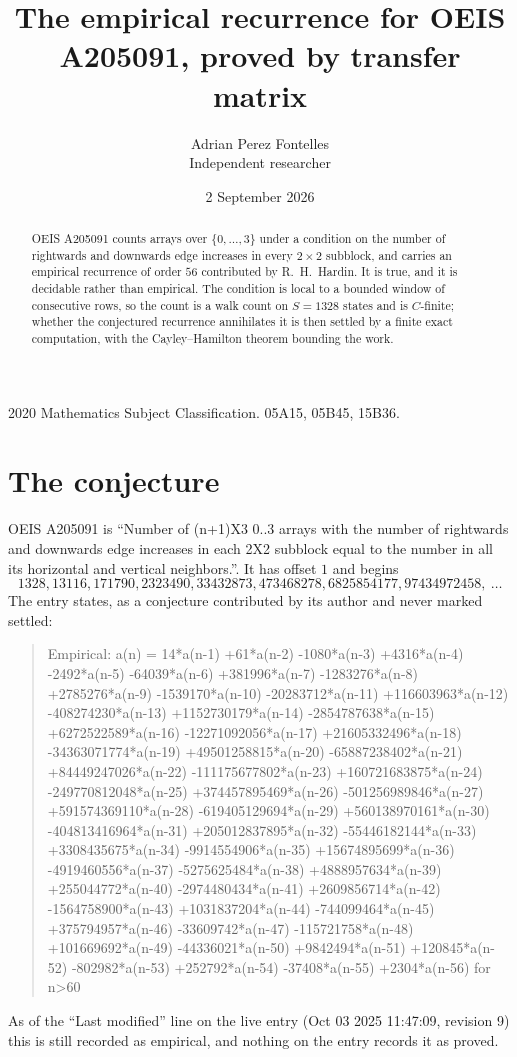 \documentclass[11pt,a4paper]{article}
\title{The empirical recurrence for OEIS A205091, proved by transfer matrix}
\author{Adrian Perez Fontelles\\ \small Independent researcher}
\date{2 September 2026}
\theoremstyle{plain}
\theoremstyle{definition}
\begin{document}
\maketitle

\begin{abstract}
OEIS A205091 counts arrays over $\{0,\dots,3\}$ under a condition on the number of rightwards and downwards edge increases
in every $2\times2$ subblock, and carries an empirical recurrence of order $56$ contributed by
R.~H.~Hardin. It is true, and it is decidable rather than empirical. The condition is local to
a bounded window of consecutive rows, so the count is a walk count on $S=1328$ states and is
$C$-finite; whether the conjectured recurrence annihilates it is then settled by a finite exact
computation, with the Cayley--Hamilton theorem bounding the work.
\end{abstract}

\noindent\small 2020 Mathematics Subject Classification. 05A15, 05B45, 15B36.\normalsize

\section{The conjecture}

OEIS A205091 is ``Number of (n+1)X3 0..3 arrays with the number of rightwards and downwards edge increases in each 2X2 subblock equal to the number in all its horizontal and vertical neighbors.''. It has offset $1$ and begins
\[
1328, 13116, 171790, 2323490, 33432873, 473468278, 6825854177, 97434972458,\ \dots
\]
The entry states, as a conjecture contributed by its author and never marked settled:
\begin{quote}
Empirical: a(n) = 14*a(n-1) +61*a(n-2) -1080*a(n-3) +4316*a(n-4) -2492*a(n-5) -64039*a(n-6) +381996*a(n-7) -1283276*a(n-8) +2785276*a(n-9) -1539170*a(n-10) -20283712*a(n-11) +116603963*a(n-12) -408274230*a(n-13) +1152730179*a(n-14) -2854787638*a(n-15) +6272522589*a(n-16) -12271092056*a(n-17) +21605332496*a(n-18) -34363071774*a(n-19) +49501258815*a(n-20) -65887238402*a(n-21) +84449247026*a(n-22) -111175677802*a(n-23) +160721683875*a(n-24) -249770812048*a(n-25) +374457895469*a(n-26) -501256989846*a(n-27) +591574369110*a(n-28) -619405129694*a(n-29) +560138970161*a(n-30) -404813416964*a(n-31) +205012837895*a(n-32) -55446182144*a(n-33) +3308435675*a(n-34) -9914554906*a(n-35) +15674895699*a(n-36) -4919460556*a(n-37) -5275625484*a(n-38) +4888957634*a(n-39) +255044772*a(n-40) -2974480434*a(n-41) +2609856714*a(n-42) -1564758900*a(n-43) +1031837204*a(n-44) -744099464*a(n-45) +375794957*a(n-46) -33609742*a(n-47) -115721758*a(n-48) +101669692*a(n-49) -44336021*a(n-50) +9842494*a(n-51) +120845*a(n-52) -802982*a(n-53) +252792*a(n-54) -37408*a(n-55) +2304*a(n-56) for n>60
\end{quote}
As of the ``Last modified'' line on the live entry (Oct 03 2025 11:47:09, revision 9) this is still
recorded as empirical, and nothing on the entry records it as proved.
\end{document}

